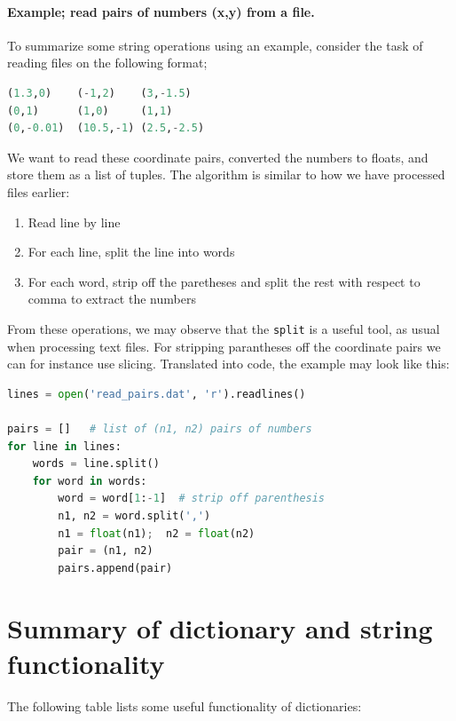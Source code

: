 \documentclass[graybox,envcountchap,sectrefs,final]{svmonodo}
\begin{document}
\paragraph{Example; read pairs of numbers (x,y) from a file.}
To summarize some string operations using an example, consider the task of reading files on the following format;
\begin{lstlisting}[language=Python,style=gray]
(1.3,0)    (-1,2)    (3,-1.5)
(0,1)      (1,0)     (1,1)
(0,-0.01)  (10.5,-1) (2.5,-2.5)
\end{lstlisting}
We want to read these coordinate pairs, converted the numbers to floats, and store them as a list of tuples. The algorithm
is similar to how we have processed files earlier:
\begin{enumerate}
\item Read line by line

\item For each line, split the line into words

\item For each word, strip off the paretheses
   and split the rest with respect to comma to extract the numbers
\end{enumerate}

\noindent
From these operations, we may observe that the \texttt{split} is a useful tool, as usual when processing text files. For stripping
parantheses off the coordinate pairs we can for instance use slicing. Translated into code, the example may look like this:
\begin{lstlisting}[language=Python,style=blue1]
lines = open('read_pairs.dat', 'r').readlines()

pairs = []   # list of (n1, n2) pairs of numbers
for line in lines:
    words = line.split()
    for word in words:
        word = word[1:-1]  # strip off parenthesis
        n1, n2 = word.split(',')
        n1 = float(n1);  n2 = float(n2)
        pair = (n1, n2)
        pairs.append(pair)
\end{lstlisting}

\section{Summary of dictionary and string functionality}
The following table lists some useful functionality of dictionaries:
\end{document}
